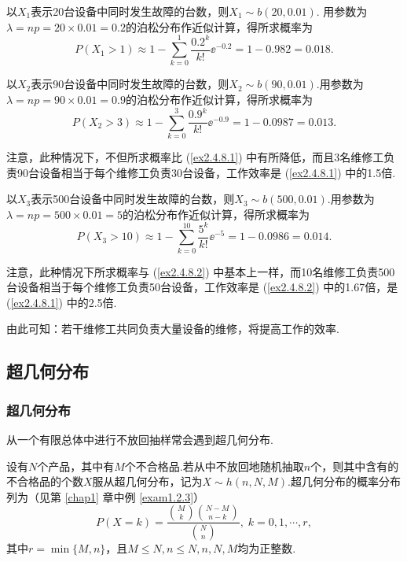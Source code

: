 \begin{solution}
  \begin{inparaenum}[(1)]
    \item 以$X_1$表示20台设备中同时发生故障的台数，则$X_1\sim b(20,0.01)$. 用参数为$\lambda=np=20\times0.01=0.2$的泊松分布作近似计算，得所求概率为
        \[
          P(X_1 > 1) \approx 1 - \sum_{k=0}^1\frac{0.2^k}{k!}\ee^{-0.2} = 1 - 0.982 = 0.018.
        \]

    \item 以$X_2$表示90台设备中同时发生故障的台数，则$X_2\sim b(90,0.01)$.用参数为$\lambda=np=90\times0.01=0.9$的泊松分布作近似计算，得所求概率为
        \[
          P(X_2 > 3) \approx 1 - \sum_{k=0}^3\frac{0.9^k}{k!}\ee^{-0.9} = 1 - 0.0987 = 0.013.
        \]

        注意，此种情况下，不但所求概率比 (\ref{ex2.4.8.1}) 中有所降低，而且3名维修工负责90台设备相当于每个维修工负责30台设备，工作效率是 (\ref{ex2.4.8.1}) 中的1.5倍.

    \item 以$X_3$表示500台设备中同时发生故障的台数，则$X_3\sim b(500,0.01)$.用参数为$\lambda=np=500\times0.01=5$的泊松分布作近似计算，得所求概率为
        \[
          P(X_3 > 10) \approx 1 - \sum_{k=0}^{10} \frac{5^k}{k!}\ee^{-5} = 1 - 0.0986 = 0.014.
        \]

        注意，此种情况下所求概率与 (\ref{ex2.4.8.2}) 中基本上一样，而10名维修工负责500台设备相当于每个维修工负责50台设备，工作效率是 (\ref{ex2.4.8.2}) 中的1.67倍，是 (\ref{ex2.4.8.1}) 中的2.5倍.
  \end{inparaenum}

  由此可知：若干维修工共同负责大量设备的维修，将提高工作的效率.
\end{solution}

\subsection{超几何分布}
\subsubsection{超几何分布}
从一个有限总体中进行不放回抽样常会遇到超几何分布.

设有$N$个产品，其中有$M$个不合格品.若从中不放回地随机抽取$n$个，则其中含有的不合格品的个数$X$服从超几何分布，记为$X\sim h(n,N,M)$.超几何分布的概率分布列为（见第 \ref{chap1} 章中例 \ref{exam1.2.3}）
\begin{equation}\label{eq2.4.6}
  P(X = k) = \frac{\binom Mk \binom{N-M}{n-k}} {\binom Nn},\; k = 0,1,\cdots,r,
\end{equation}
其中$r=\min\{M,n\}$，且$M\le N,n\le N,n,N,M$均为正整数.

